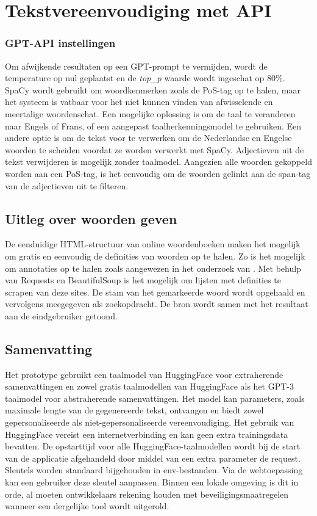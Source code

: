 \section{Tekstvereenvoudiging met API}

\subsubsection{GPT-API instellingen}

Om afwijkende resultaten op een GPT-prompt te vermijden, wordt de temperature op nul geplaatst en de \textit{top\_p} waarde wordt ingeschat op 80\%. SpaCy wordt gebruikt om woordkenmerken zoals de PoS-tag op te halen, maar het systeem is vatbaar voor het niet kunnen vinden van afwisselende en meertalige woordenschat. Een mogelijke oplossing is om de taal te veranderen naar Engels of Frans, of een aangepast taalherkenningsmodel te gebruiken. Een andere optie is om de tekst voor te verwerken om de Nederlandse en Engelse woorden te scheiden voordat ze worden verwerkt met SpaCy. Adjectieven uit de tekst verwijderen is mogelijk zonder taalmodel. Aangezien alle woorden gekoppeld worden aan een PoS-tag, is het eenvoudig om de woorden gelinkt aan de span-tag van de adjectieven uit te filteren.

\subsection{Uitleg over woorden geven}

De eenduidige HTML-structuur van online woordenboeken maken het mogelijk om gratis en eenvoudig de definities van woorden op te halen. Zo is het mogelijk om annotaties op te halen zoals aangewezen in het onderzoek van \textcite{Bulté2018}. Met behulp van Requests en BeautifulSoup is het mogelijk om lijsten met definities te scrapen van deze sites. De stam van het gemarkeerde woord wordt opgehaald en vervolgens meegegeven als zoekopdracht. De bron wordt samen met het resultaat aan de eindgebruiker getoond. 

\subsection{Samenvatting}

Het prototype gebruikt een taalmodel van HuggingFace voor extraherende samenvattingen en zowel gratis taalmodellen van HuggingFace als het GPT-3 taalmodel voor abstraherende samenvattingen. Het model kan parameters, zoals maximale lengte van de gegenereerde tekst, ontvangen en biedt zowel gepersonaliseerde als niet-gepersonaliseerde vereenvoudiging. Het gebruik van HuggingFace vereist een internetverbinding en kan geen extra trainingsdata bevatten. De opstarttijd voor alle HuggingFace-taalmodellen wordt bij de start van de applicatie afgehandeld door middel van een extra parameter de request. Sleutels worden standaard bijgehouden in env-bestanden. Via de webtoepassing kan een gebruiker deze sleutel aanpassen. Binnen een lokale omgeving is dit in orde, al moeten ontwikkelaars rekening houden met beveiligingsmaatregelen wanneer een dergelijke tool wordt uitgerold.

